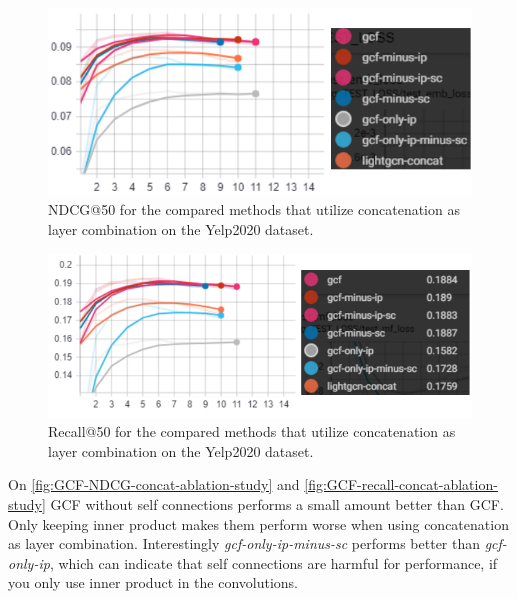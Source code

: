 \begin{figure}[h!]
    \includegraphics[width=\linewidth]{figures/gcf-ndcg-concat.png}
    \caption{NDCG@50 for the compared methods that utilize concatenation as layer combination on the Yelp2020 dataset.}
    \label{fig:GCF-NDCG-concat-ablation-study}
\end{figure}
\begin{figure}[h!]
    \includegraphics[width=\linewidth]{figures/gcf-concat-recall.png}
    \caption{Recall@50 for the compared methods that utilize concatenation as layer combination on the Yelp2020 dataset.}
    \label{fig:GCF-recall-concat-ablation-study}
\end{figure}
On \autoref{fig:GCF-NDCG-concat-ablation-study} and \autoref{fig:GCF-recall-concat-ablation-study} GCF without self connections performs a small amount better than GCF.
Only keeping inner product makes them perform worse when using concatenation as layer combination.
Interestingly \textit{gcf-only-ip-minus-sc} performs better than \textit{gcf-only-ip}, which can indicate that self connections are harmful for performance, if you only use inner product in the convolutions.
